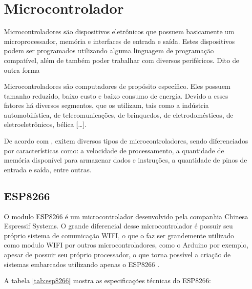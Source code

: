 \section{Microcontrolador}

Microcontroladores são dispositivos eletrônicos que possuem basicamente um microprocessador, memória e interfaces de entrada e saída. Estes dispositivos podem ser programados utilizando alguma linguagem de programação compatível, além de também poder trabalhar com diversos periféricos. Dito de outra forma

\begin{citacao}
	Microcontroladores são computadores de propósito específico. Eles possuem tamanho reduzido, baixo custo e baixo consumo de energia. Devido a esses fatores há diversos segmentos, que os utilizam, tais como a indústria automobilística, de telecomunicações, de brinquedos, de eletrodomésticos, de eletroeletrônicos, bélica [\ldots]. \cite{silva2009}  
\end{citacao}

De acordo com , exitem diversos tipos de microcontroladores, sendo diferenciados por características como: a velocidade de processamento, a quantidade de memória disponível para armazenar dados e instruções, a quantidade de pinos de entrada e saída, entre outras.

\subsection{ESP8266} 

O modulo ESP8266 é um microcontrolador desenvolvido pela companhia Chinesa Espressif Systems.
O grande diferencial desse microcontrolador é possuir seu próprio sistema de comunicação WIFI, o que o faz ser grandemente utilizado como modulo WIFI por outros microcontroladores, como o Arduino por exemplo, apesar de possuir seu próprio processador, o que torna possível a criação de sistemas embarcados utilizando apenas o ESP8266 \cite[p.~26-27]{kolban2015espbook}.

A tabela \ref{tab:esp8266} mostra as especificações técnicas do ESP8266:

